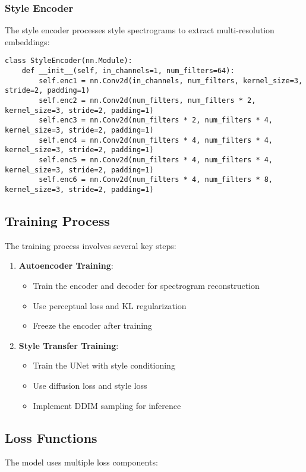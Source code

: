\subsubsection{Style Encoder}
The style encoder processes style spectrograms to extract multi-resolution embeddings:
\begin{lstlisting}
class StyleEncoder(nn.Module):
    def __init__(self, in_channels=1, num_filters=64):
        self.enc1 = nn.Conv2d(in_channels, num_filters, kernel_size=3, stride=2, padding=1)
        self.enc2 = nn.Conv2d(num_filters, num_filters * 2, kernel_size=3, stride=2, padding=1)
        self.enc3 = nn.Conv2d(num_filters * 2, num_filters * 4, kernel_size=3, stride=2, padding=1)
        self.enc4 = nn.Conv2d(num_filters * 4, num_filters * 4, kernel_size=3, stride=2, padding=1)
        self.enc5 = nn.Conv2d(num_filters * 4, num_filters * 4, kernel_size=3, stride=2, padding=1)
        self.enc6 = nn.Conv2d(num_filters * 4, num_filters * 8, kernel_size=3, stride=2, padding=1)
\end{lstlisting}

\subsection{Training Process}
The training process involves several key steps:

\begin{enumerate}
    \item \textbf{Autoencoder Training}:
    \begin{itemize}
        \item Train the encoder and decoder for spectrogram reconstruction
        \item Use perceptual loss and KL regularization
        \item Freeze the encoder after training
    \end{itemize}
    
    \item \textbf{Style Transfer Training}:
    \begin{itemize}
        \item Train the UNet with style conditioning
        \item Use diffusion loss and style loss
        \item Implement DDIM sampling for inference
    \end{itemize}
\end{enumerate}

\subsection{Loss Functions}
The model uses multiple loss components:

